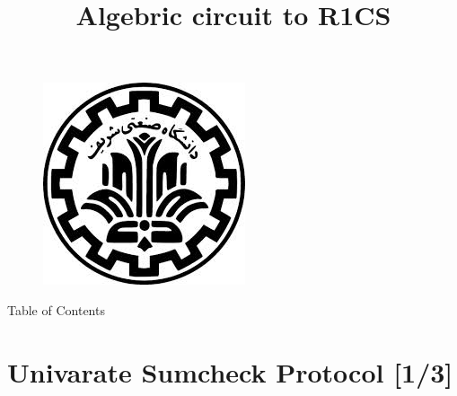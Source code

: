 \documentclass{beamer}
\title{
Algebric circuit to R1CS
}
\date{}
\newcommand{\npso}{\text{PSO}}
\newcommand{\nmadjoin}{\text{M-Adjoin}}
\begin{document}
\begin{frame}
\begin{figure}[h]
\centering
\includegraphics[scale=0.2]{logo}
\end{figure}

  \titlepage
\end{frame}

\begin{frame}{Table of Contents}

{\footnotesize{}
\begin{multicols}{2}
\tableofcontents
\end{multicols}	
}	
\end{frame}



\section{Univarate Sumcheck Protocol [1/3]}
\end{document}
